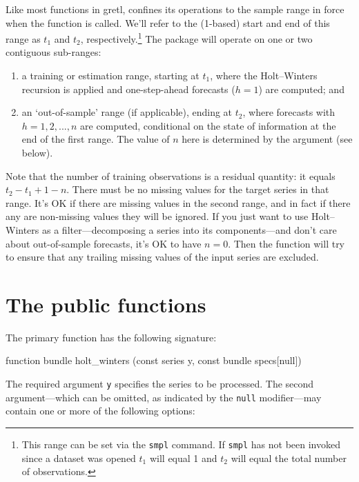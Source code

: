 \documentclass{article}
\begin{document}
Like most functions in gretl,  confines its
operations to the sample range in force when the function is
called. We'll refer to the (1-based) start and end of this range as
$t_1$ and $t_2$, respectively.\footnote{This range can be set via the
  \texttt{smpl} command. If \texttt{smpl} has not been invoked since a
  dataset was opened $t_1$ will equal 1 and $t_2$ will equal the total
  number of observations.} The package will operate on one or two
contiguous sub-ranges:
\begin{enumerate}
\item a training or estimation range, starting at
  $t_1$, where the Holt--Winters recursion is applied and
  one-step-ahead forecasts ($h=1$) are computed; and
\item an `out-of-sample' range (if applicable), ending at
  $t_2$, where forecasts with
  $h=1,2,...,n$ are computed, conditional on the state of information
  at the end of the first range. The value of
  $n$ here is determined by the argument  (see below).
\end{enumerate}

Note that the number of training observations is a residual quantity: it
equals $t_2 - t_1 + 1 - n$. There must be no missing values for the
target series in that range. It's OK if there are missing values in the
second range, and in fact if there any are non-missing values they will
be ignored. If you just want to use Holt--Winters as a
filter---decomposing a series into its components---and don't care about
out-of-sample forecasts, it's OK to have $n=0$. Then the function will
try to ensure that any trailing missing values of the input series are
excluded.

\section{The public functions}

The primary function has the following signature:
\begin{nscode}
function bundle holt_winters (const series y, const bundle specs[null])
\end{nscode}

The required argument \texttt{y} specifies the series to be processed.
The second argument---which can be omitted, as indicated by the
\texttt{null} modifier---may contain one or more of the following
options:
\end{document}
